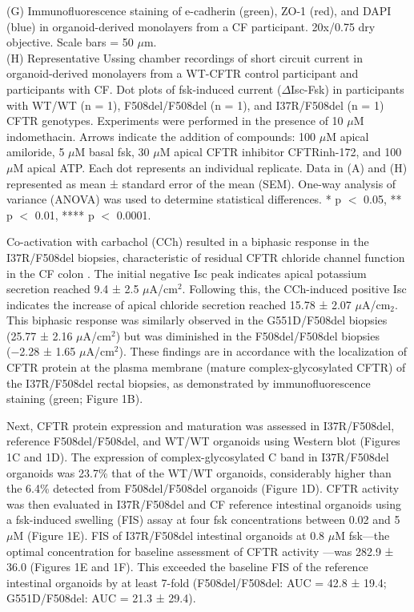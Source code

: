 {(G) Immunofluorescence staining of e-cadherin (green), ZO-1 (red), and DAPI (blue) in organoid-derived monolayers from a CF participant. 20x/0.75 dry objective. Scale bars = 50 $\mu$m.\\

(H) Representative Ussing chamber recordings of short circuit current in organoid-derived monolayers from a WT-CFTR control participant and participants with CF. Dot plots of fsk-induced current ($\Delta$Isc-Fsk) in participants with WT/WT (n = 1), F508del/F508del (n = 1), and I37R/F508del (n = 1) CFTR genotypes. Experiments were performed in the presence of 10 $\mu$M indomethacin. Arrows indicate the addition of compounds: 100 $\mu$M apical amiloride, 5 $\mu$M basal fsk, 30 $\mu$M apical CFTR inhibitor CFTRinh-172, and 100 $\mu$M apical ATP. Each dot represents an individual replicate. Data in (A) and (H) represented as mean ± standard error of the mean (SEM). One-way analysis of variance (ANOVA) was used to determine statistical differences. * p $<$ 0.05, ** p $<$ 0.01, **** p $<$ 0.0001.\\
}
\endgroup

\smallskip

Co-activation with carbachol (CCh) resulted in a biphasic response in the I37R/F508del biopsies, characteristic of residual CFTR chloride channel function in the CF colon \cite{graeber2015,veeze1994}. The initial negative Isc peak indicates apical potassium secretion reached 9.4 ± 2.5 $\mu$A/cm$^2$. Following this, the CCh-induced positive Isc indicates the increase of apical chloride secretion reached 15.78 ± 2.07 $\mu$A/cm$_2$. This biphasic response was similarly observed in the G551D/F508del biopsies (25.77 ± 2.16 $\mu$A/cm$^2$) but was diminished in the F508del/F508del biopsies (−2.28 ± 1.65 $\mu$A/cm$^2$). These findings are in accordance with the localization of CFTR protein at the plasma membrane (mature complex-glycosylated CFTR) of the I37R/F508del rectal biopsies, as demonstrated by immunofluorescence staining (green; Figure 1B).

Next, CFTR protein expression and maturation was assessed in I37R/F508del, reference F508del/F508del, and WT/WT organoids using Western blot (Figures 1C and 1D). The expression of complex-glycosylated C band in I37R/F508del organoids was 23.7\% that of the WT/WT organoids, considerably higher than the 6.4\% detected from F508del/F508del organoids (Figure 1D). CFTR activity was then evaluated in I37R/F508del and CF reference intestinal organoids using a fsk-induced swelling (FIS) assay at four fsk concentrations between 0.02 and 5 $\mu$M (Figure 1E). FIS of I37R/F508del intestinal organoids at 0.8 $\mu$M fsk—the optimal concentration for baseline assessment of CFTR activity \cite{dekkers2016}—was 282.9 ± 36.0 (Figures 1E and 1F). This exceeded the baseline FIS of the reference intestinal organoids by at least 7-fold (F508del/F508del: AUC = 42.8 ± 19.4; G551D/F508del: AUC = 21.3 ± 29.4).

